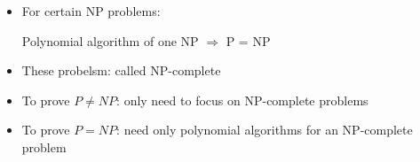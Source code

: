 \begin{frame}[allowframebreaks]
\begin{itemize}
\item For certain NP problems:

Polynomial algorithm of one NP $\Rightarrow$ P = NP



\item These probelsm: called NP-complete
\item To prove $P \neq NP$: only need to focus on
NP-complete problems
\item To prove $P=NP$: need only polynomial algorithms
for an NP-complete problem
\end{itemize}
\end{frame}

